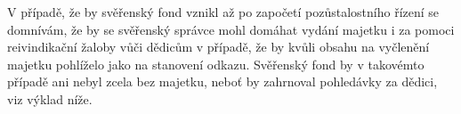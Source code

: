 \documentclass{article}
\begin{document}
V případě, že by svěřenský fond vznikl až po započetí pozůstalostního řízení se domnívám, že by se svěřenský správce mohl domáhat vydání majetku i za pomoci reivindikační žaloby vůči dědicům v případě, že by kvůli obsahu na vyčlenění majetku pohlíželo jako na stanovení odkazu. Svěřenský fond by v takovémto případě ani nebyl zcela bez majetku, neboť by zahrnoval pohledávky za dědici, viz výklad níže.\\




\end{document}
